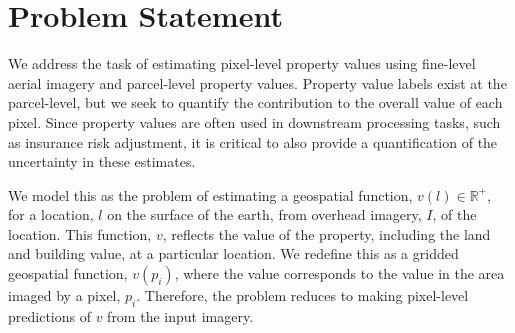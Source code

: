 \documentclass[10pt,twocolumn,a4paper]{article}
\begin{document}



\section{Problem Statement}

We address the task of estimating pixel-level property values using fine-level aerial imagery and parcel-level property values. Property value labels exist at the parcel-level, but we seek to quantify the contribution to the overall value of each pixel. Since property values are often used in downstream processing tasks, such as insurance risk adjustment, it is critical to also provide a quantification of the uncertainty in these estimates.

We model this as the problem of estimating a geospatial function, $v(l)\in\mathbb{R}^+$, for a location, $l$ on the surface of the earth, from overhead imagery, $I$, of the location. This function, $v$, reflects the value of the property, including the land and building value, at a particular location. We redefine this as a gridded geospatial function, $v(p_i)$, where the value corresponds to the value in the area imaged by a pixel, $p_i$. Therefore, the problem reduces to making pixel-level predictions of $v$ from the input imagery.
\end{document}
